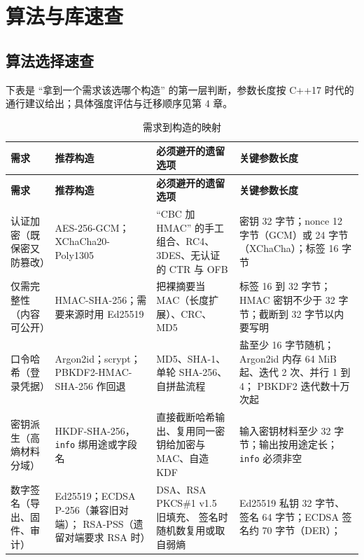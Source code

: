 \documentclass[12pt,a4paper,fontset=fandol]{ctexbook}
\newcommand{\cpp}[1]{C++#1}
\newcommand{\Tp}[1]{\texttt{#1}}
\begin{document}
\appendix

\chapter{算法与库速查}

\section{算法选择速查}

下表是 ``拿到一个需求该选哪个构造'' 的第一层判断，参数长度按 \cpp{17}
时代的通行建议给出；具体强度评估与迁移顺序见第 4 章。

\begin{footnotesize}
\begin{longtable}{@{}>{\raggedright\arraybackslash}p{}
                  >{\raggedright\arraybackslash}p{}
                  >{\raggedright\arraybackslash}p{}
                  >{\raggedright\arraybackslash}p{}@{}}
\caption{需求到构造的映射}\\
\toprule
\textbf{需求} & \textbf{推荐构造} & \textbf{必须避开的遗留选项} &
\textbf{关键参数长度} \\
\midrule
\endfirsthead
\toprule
\textbf{需求} & \textbf{推荐构造} & \textbf{必须避开的遗留选项} &
\textbf{关键参数长度} \\
\midrule
\endhead
认证加密（既保密又防篡改） & AES-256-GCM；XChaCha20-Poly1305 &
``CBC 加 HMAC'' 的手工组合、RC4、3DES、无认证的 CTR 与 OFB &
密钥 32 字节；nonce 12 字节（GCM）或 24 字节（XChaCha）；标签 16 字节 \\
仅需完整性（内容可公开） & HMAC-SHA-256；需要来源时用 Ed25519 &
把裸摘要当 MAC（长度扩展）、CRC、MD5 &
标签 16 到 32 字节；HMAC 密钥不少于 32 字节；截断到 32 字节以内要写明 \\
口令哈希（登录凭据） & Argon2id；scrypt；PBKDF2-HMAC-SHA-256 作回退 &
MD5、SHA-1、单轮 SHA-256、自拼盐流程 &
盐至少 16 字节随机；Argon2id 内存 64 MiB 起、迭代 2 次、并行 1 到 4；
PBKDF2 迭代数十万次起 \\
密钥派生（高熵材料分域） & HKDF-SHA-256，\Tp{info} 绑用途或字段名 &
直接截断哈希输出、复用同一密钥给加密与 MAC、自造 KDF &
输入密钥材料至少 32 字节；输出按用途定长；\Tp{info} 必须非空 \\
数字签名（导出、固件、审计） & Ed25519；ECDSA P-256（兼容旧对端）；
RSA-PSS（遗留对端要求 RSA 时） & DSA、RSA PKCS\#1 v1.5 旧填充、
签名时随机数复用或取自弱熵 &
Ed25519 私钥 32 字节、签名 64 字节；ECDSA 签名约 70 字节（DER）；

\end{longtable}
\end{footnotesize}
\end{document}
